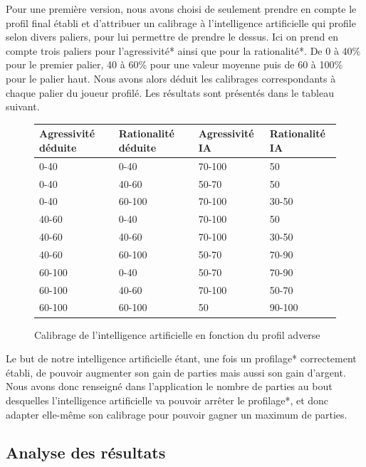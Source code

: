 \documentclass{report}
\begin{document}
\hspace{0.5cm}Pour une première version, nous avons choisi de seulement prendre en compte le profil final établi et d'attribuer un calibrage à l'intelligence artificielle qui profile selon divers paliers, pour lui permettre de prendre le dessus. Ici on prend en compte trois paliers pour l'agressivité* ainsi que pour la rationalité*. De 0 à 40\% pour le premier palier, 40 à 60\% pour une valeur moyenne puis de 60 à 100\% pour le palier haut. Nous avons alors déduit les calibrages correspondants à chaque palier du joueur profilé. Les résultats sont présentés dans le tableau suivant.\\
\begin{figure}[H]
\begin{center}
\begin{tabular}{|l|l|l|l|}
\hline
Agressivité déduite & Rationalité déduite &	Agressivité IA & 	Rationalité IA\\
\hline
0-40	 			    & 0-40 				 & 	70-100		   & 50\\
\hline
0-40					&	40-60			 &	50-70		   & 	50\\
\hline
0-40					& 60-100				 &	70-100		   &	30-50\\
\hline
40-60				&	0-40				 &	70-100		   &	50\\
\hline
40-60				&	40-60			&	70-100			&	30-50\\
\hline
40-60				&	60-100			&	50-70			&	70-90\\
\hline
60-100				&	0-40				&	50-70			&	70-90\\
\hline
60-100				&	40-60			&	70-100			&	50-70\\
\hline
60-100				&	60-100			&	50				&	90-100\\
\hline
\end{tabular}
\end{center}
\caption{Calibrage de l'intelligence artificielle en fonction du profil adverse}
\end{figure}


Le but de notre intelligence artificielle étant, une fois un profilage* correctement établi, de pouvoir augmenter son gain de parties mais aussi son gain d'argent. Nous avons donc renseigné dans l'application le nombre de parties au bout desquelles l'intelligence artificielle va pouvoir arrêter le profilage*, et donc adapter elle-même son calibrage pour pouvoir gagner un maximum de parties.\\

\subsection{Analyse des résultats}
\end{document}
